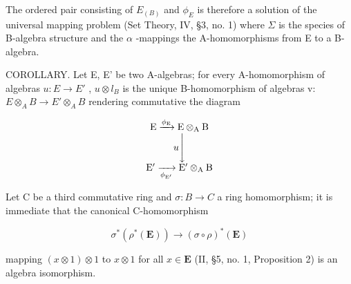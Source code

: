 The ordered pair consisting of \(E_{(B)}\) and \(\phi_{E}\) is therefore a solution of the universal mapping problem (Set Theory, IV, §3, no. 1) where \(\Sigma\) is the species of B-algebra structure and the \(\alpha\) -mappings the A-homomorphisms from E to a B-algebra.

COROLLARY. Let E, E' be two A-algebras; for every A-homomorphism of algebras \(u: E \to E'\) , \(u \otimes l_{B}\) is the unique B-homomorphism of algebras v: \(E \otimes_{A} B \to E' \otimes_{A} B\) rendering commutative the diagram

\[
\begin{array}{c} \mathrm{E} \xrightarrow {\phi_ {\mathrm{E}}} \mathrm{E} \otimes_ {\mathrm{A}} \mathrm{B} \\ u \Biggl \downarrow \\ \mathrm{E} ^ {\prime} \xrightarrow [ \phi_ {\mathrm{E} ^ {\prime}} ]{} \mathrm{E} ^ {\prime} \otimes_ {\mathrm{A}} \mathrm{B} \end{array}
\]

Let C be a third commutative ring and \(\sigma: B \to C\) a ring homomorphism; it is immediate that the canonical C-homomorphism

\[
\sigma^ {*} (\rho^ {*} (\mathbf {E})) \rightarrow (\sigma \circ \rho) ^ {*} (\mathbf {E})
\]

mapping \((x\otimes 1)\otimes 1\) to \(x\otimes 1\) for all \(x\in \mathbf{E}\) (II, §5, no. 1, Proposition 2) is an algebra isomorphism.

